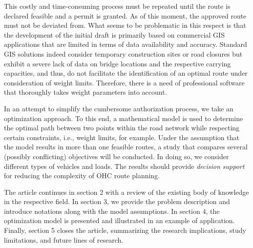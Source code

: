 This costly and time-consuming process must be repeated until the route is declared feasible and a permit is granted. As of this moment, the approved route must not be deviated from.
What seems to be problematic in this respect is that the development of the initial draft is primarily based on commercial GIS applications that are limited in terms of data availability and accuracy.
Standard GIS solutions indeed consider temporary construction sites or road closures but exhibit a severe lack of data on bridge locations and the respective carrying capacities, and thus, do not facilitate the identification of an optimal route under consideration of weight limits.
Therefore, there is a need of professional software that thoroughly takes weight parameters into account.
\par In an attempt to simplify the cumbersome authorization process, we take an optimization approach.
To this end, a mathematical model is used to determine the optimal path between two points within the road network while respecting certain constraints, i.e., weight limits, for example.
Under the assumption that the model results in more than one feasible routes, a study that compares several (possibly conflicting) objectives will be conducted.
In doing so, we consider different types of vehicles and loads. The results should provide \textit{decision support} for reducing the complexity of OHC route planning. 
\par
The article continues in section 2 with a review of the existing body of knowledge in the respective field.
In section 3, we provide the problem description and introduce notations along with the model assumptions. In section 4, the optimization model is presented and illustrated in an example of application.
Finally, section 5 closes the article, summarizing the research implications, study limitations, and future lines of research.


